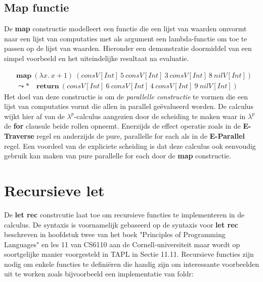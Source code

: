 \subsection{Map functie}
De \textbf{map} constructie modelleert een functie die een lijst van waarden omvormt naar een lijst van computaties met als argument een lambda-functie om toe te passen op de lijst van waarden. Hieronder een demonstratie doormiddel van een simpel voorbeeld en het uiteindelijke resultaat na evaluatie.

\begin{equation}
    \begin{split}
        & \textbf{map}\:(\lambda x . \ x+1)\:(consV[Int] \ 5 \ consV[Int] \  3 \  consV[Int] \ 8 \  nilV[Int]) \\
        & \leadsto * \quad \textbf{return} \  (consV[Int] \ 6 \ consV[Int] \  4 \  consV[Int] \ 9 \  nilV[Int])
    \end{split}
\end{equation}
Het doel van deze constructie is om de \emph{parallelle constructie} te vormen die een lijst van computaties vormt die allen in parallel geëvalueerd worden. De calculus wijkt hier af van de $\lambda^p$-calculus aangezien door de scheiding te maken waar in $\lambda^{p}$ de \textbf{for} clausule beide rollen opneemt. Enerzijds de effect operatie zoals in de \textbf{E-Traverse} regel en anderzijds de pure, parallelle for each als in de \textbf{E-Parallel} regel. \newline 
Een voordeel van de expliciete scheiding is dat deze calculus ook eenvoudig gebruik kan maken van pure parallelle for each door de \textbf{map} constructie.

\section{Recursieve let}
De \textbf{let rec} constrcutie laat toe om recursieve functies te implementeren in de calculus. De syntaxis is voornamelijk gebaseerd op de syntaxis voor \textbf{let rec} beschreven in hoofdstuk twee van het boek "Principles of Programming Languages" \cite{Palmer2009} en les 11 van CS6110 aan de Cornell-universiteit \cite{Sampson2018} maar wordt op soortgelijke manier voorgesteld in TAPL \cite{Pierce2002} in Sectie 11.11. \newline 
Recursieve functies zijn nodig om enkele functies te definiëren die handig zijn om interessante voorbeelden uit te worken zoals bijvoorbeeld een implementatie van foldr:

